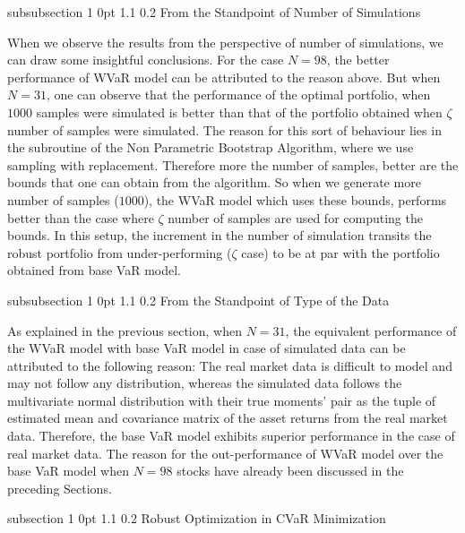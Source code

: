 \documentclass[12pt]{article}
\makeatletter
\numberwithin{equation}{section}
\renewcommand{\subsection}{
  \@startsection
  {subsection}%
  {1}%
  {0pt}%
  {1.1\baselineskip}%
  {0.2\baselineskip}%
  {\sc \centering}%
}
\renewcommand{\subsubsection}{
  \@startsection
  {subsubsection}%
  {1}%
  {0pt}%
  {1.1\baselineskip}%
  {0.2\baselineskip}%
  {\sc \centering}%
}
\makeatother
\begin{document}
\subsubsection{From the Standpoint of Number of Simulations}

When we observe the results from the perspective of number of simulations, we can draw some insightful conclusions. For the case $N=98$, the better performance of WVaR model can be attributed to the reason above. But when $N=31$, one can observe that the performance of the optimal portfolio, when $1000$ samples were simulated is better than that of the portfolio obtained when $\zeta$ number of samples were simulated. The reason for this sort of behaviour lies in the subroutine of the Non Parametric Bootstrap Algorithm, where we use sampling with replacement. Therefore more the number of samples, better are the bounds that one can obtain from the algorithm. So when we generate more number of samples ($1000$), the WVaR model which uses these bounds, performs better than the case where $\zeta$ number of samples are used for computing the bounds. In this setup, the increment in the number of simulation transits the robust portfolio from under-performing ($\zeta$ case) to be at par with the portfolio obtained from base VaR model.

\subsubsection{From the Standpoint of Type of the Data}

As explained in the previous section, when $N=31$, the equivalent performance of the WVaR model with base VaR model in case of simulated data can be attributed to the following reason: The real market data is difficult to model and may not follow any distribution, whereas the simulated data follows the multivariate normal distribution with their true moments' pair as the tuple of estimated mean and covariance matrix of the asset returns from the real market data. Therefore, the base VaR model exhibits superior performance in the case of real market data. The reason for the out-performance of WVaR model over the base VaR model when $N=98$ stocks have already been discussed in the preceding Sections.

\subsection{Robust Optimization in CVaR Minimization}
\end{document}
